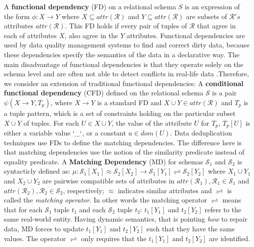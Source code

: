 A \textbf{functional dependency} (FD) on a relational schema $S$ is an expression of the form $\phi: X \rightarrow Y$ where $X \subseteq attr(\mathcal{R}) $ and $Y \subseteq attr(\mathcal{R}) $ are subsets of $\mathcal{R}'s$ attributes $attr(\mathcal{R})$. This FD holds if every pair of tuples of $\mathcal{R}$ that agree in each of attributes $X$, also agree in the $Y$ attributes. Functional dependencies are used by data quality management systems to find and correct dirty data, because these dependencies specify the semantics of the data in a declarative way. The main disadvantage of functional dependencies is that they operate solely on the schema level and are often not able to detect conflicts in real-life data .Therefore, we consider an  extension of traditional functional dependencies:  A \textbf{conditional functional dependency} (CFD) defined on the relational schema $\mathcal{S}$ is a pair $\psi(X \rightarrow Y , T_p)$,  where $X \rightarrow Y$ is a standard FD and $X \cup Y \in attr(\mathcal{R})$ and $T_p$ is a tuple pattern, which is a set of constraints holding on the particular subset $X \cup Y$ of tuples. For each $U \in X \cup Y$, the value of the attribute $U$ for $T_p$, $T_p[U]$ is either a variable value $`\_`$, or a constant $u \in dom(U)$.  Data deduplication techniques use FDs to define the matching dependencies. The difference here is that matching dependencies use the notion of the similarity predicate instead of equality predicate. A \textbf{Matching Dependency} (MD) for schemas $\mathcal{S}_1$ and $\mathcal{S}_2$ is syntacticly defined as:
  $\mu: \mathcal{S}_1[X_1]\approx \mathcal{S}_2[X_2]\rightarrow \mathcal{S}_1[Y_1]\rightleftharpoons \mathcal{S}_2[Y_2]$ 
  where $X_1 \cup Y_1$ and $X_2 \cup Y_2$ are pairwise compatible sets of attributes in $attr(\mathcal{R}_1), \mathcal{R}_1\in \mathcal{S}_1$ and $attr(\mathcal{R}_2), \mathcal{R}_2\in \mathcal{S}_2$, respectively; $\approx$ indicates
  similar attributes and $\rightleftharpoons$ is called the \textit{matching operator}. In other words the matching operator $\rightleftharpoons$ means that for each $\mathcal{S}_1$ tuple $t_1$ and each $\mathcal{S}_2$ tuple $t_2$: $t_1[Y_1]$ and $t_2[Y_2]$ refers to the same real-world entity. Having dynamic semantics, that is pointing \textit{how} to repair data, MD forces to update $t_1[Y_1]$ and $t_2[Y_2]$ such that they have the same values. The operator $\rightleftharpoons$ only requires that the $t_1[Y_1]$ and $t_2[Y_2]$ are identified.

